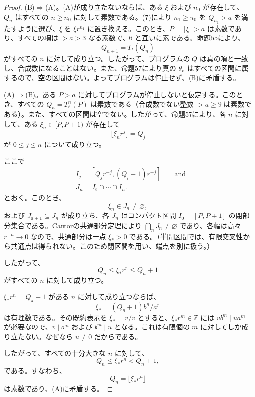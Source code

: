 \documentclass[11pt,reqno]{amsart}
\theoremstyle{definition}
\theoremstyle{definition}
\theoremstyle{remark}
\begin{document}
\begin{proof}\leavevmode\label{proof:58}
(B)\(\Rightarrow\)(A)。(A)が成り立たないならば、ある \(\xi\) および \(n_0\) が存在して、\(Q_n\) はすべての \(n\ge n_0\) に対して素数である。(7)により \(n_1\ge n_0\) を \(Q_{n_1}>a\) を満たすように選び、\(\xi\) を \(\xi r^{n_1}\) に置き換える。このとき、\(P=\lfloor\xi\rfloor>a\) は素数であり、すべての項は \(>a>3\) なる素数で、\(6\) と互いに素である。命題55により、
\[
Q_{n+1}=T_t(Q_n)
\]
がすべての \(n\) に対して成り立つ。したがって、プログラムの \(Q\) は真の項と一致し、合成数になることはない。また、命題57により真の \(\theta_n\) はすべての区間に属するので、空の区間はない。よってプログラムは停止せず、(B)に矛盾する。

(A)\(\Rightarrow\)(B)。ある \(P>a\) に対してプログラムが停止しないと仮定する。このとき、すべての \(Q_n=T_t^n(P)\) は素数である（合成数でない整数 \(>a\ge9\) は素数である）。また、すべての区間は空でない。したがって、命題57により、各 \(n\) に対して、ある \(\xi_n\in[P,P+1)\) が存在して
\[
\lfloor\xi_nr^j\rfloor=Q_j
\]
が \(0\le j\le n\) について成り立つ。

ここで
\[
\begin{aligned}
&I_j=[Q_jr^{-j},(Q_j+1)r^{-j}]\qquad \text{and}\\
&J_n=I_0\cap\cdots\cap I_n.
\end{aligned}
\]
とおく。このとき、
\[
\xi_n\in J_n\ne\varnothing,
\]
および \(J_{n+1}\subseteq J_n\) が成り立ち、各 \(J_n\) はコンパクト区間 \(I_0=[P,P+1]\) の閉部分集合である。Cantorの共通部分定理により \(\bigcap_nJ_n\ne\varnothing\) であり、各幅は高々 \(r^{-n}\to0\) なので、共通部分は一点 \(\xi_*>0\) である。（半開区間では、有限交叉性から共通点は得られない。このため閉区間を用い、端点を別に扱う。）

したがって、
\[
Q_n\le\xi_*r^n\le Q_n+1
\]
がすべての \(n\) に対して成り立つ。

\(\xi_*r^n=Q_n+1\) がある \(n\) に対して成り立つならば、
\[
\xi_*=(Q_n+1)b^n/a^n
\]
は有理数である。その既約表示を \(\xi_*=u/v\) とすると、\(\xi_*r^m\in\mathbb Z\) には \(vb^m\mid ua^m\) が必要なので、\(v\mid a^m\) および \(b^m\mid u\) となる。これは有限個の \(m\) に対してしか成り立たない。なぜなら \(u\ne0\) だからである。

したがって、すべての十分大きな \(n\) に対して、
\[
Q_n\le\xi_*r^n<Q_n+1,
\]
である。すなわち、
\[
Q_n=\lfloor\xi_*r^n\rfloor
\]
は素数であり、(A)に矛盾する。\qedhere
\end{proof}
\end{document}
